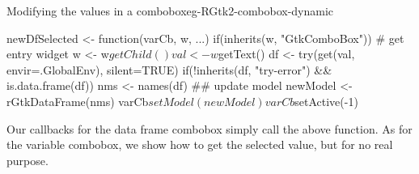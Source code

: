 \begin{example}{Modifying the values in a combobox}{eg-RGtk2-combobox-dynamic}
\begin{Schunk}
\begin{Sinput}
 newDfSelected <- function(varCb, w, ...) {
   if(inherits(w, "GtkComboBox"))        # get entry widget
     w <- w$getChild()
   val <- w$getText()
   df <- try(get(val, envir=.GlobalEnv), silent=TRUE)
   if(!inherits(df, "try-error") && is.data.frame(df)) {
     nms <- names(df)
     ## update model
     newModel <- rGtkDataFrame(nms)
     varCb$setModel(newModel)
     varCb$setActive(-1)
   }
 }
\end{Sinput}
\end{Schunk}
Our callbacks for the data frame combobox simply call the above
function. As for the variable combobox, we show how to get the
selected value, but for no real purpose.
\begin{Schunk}
\end{Schunk}
\end{example}

